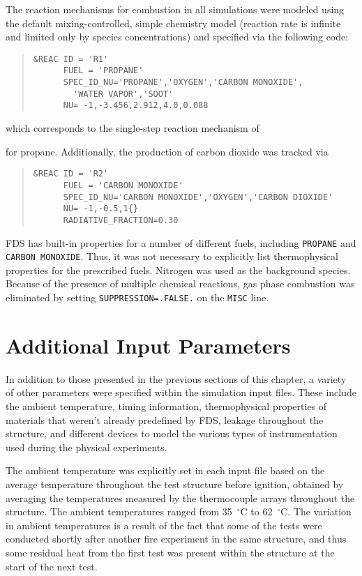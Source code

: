 The reaction mechanisms for combustion in all simulations were modeled using the default mixing-controlled, simple chemistry model (reaction rate is infinite and limited only by species concentrations) and specified via the following code:
\begin{quote}
\begin{verbatim}
&REAC ID = 'R1'
      FUEL = 'PROPANE'
      SPEC_ID_NU='PROPANE','OXYGEN','CARBON MONOXIDE',
        'WATER VAPOR','SOOT'
      NU= -1,-3.456,2.912,4.0,0.088 
\end{verbatim}
\end{quote}
\noindent which corresponds to the single-step reaction mechanism of
\begin{center}
\end{center}
for propane. Additionally, the production of carbon dioxide was tracked via
\begin{quote}
\begin{verbatim}
&REAC ID = 'R2'
      FUEL = 'CARBON MONOXIDE'
      SPEC_ID_NU='CARBON MONOXIDE','OXYGEN','CARBON DIOXIDE'
      NU= -1,-0.5,1{}
      RADIATIVE_FRACTION=0.30   
\end{verbatim}
\end{quote}

FDS has built-in properties for a number of different fuels, including \verb|PROPANE| and \verb|CARBON MONOXIDE|. Thus, it was not necessary to explicitly list thermophysical properties for the prescribed fuels. Nitrogen was used as the background species. Because of the presence of multiple chemical reactions, gas phase combustion was eliminated by setting \verb|SUPPRESSION=.FALSE.| on the \verb|MISC| line.

\section{Additional Input Parameters}
In addition to those presented in the previous sections of this chapter, a variety of other parameters were specified within the simulation input files. These include the ambient temperature, timing information, thermophysical properties of materials that weren't already predefined by FDS, leakage throughout the structure, and different devices to model the various types of instrumentation used during the physical experiments.

The ambient temperature was explicitly set in each input file based on the average temperature throughout the test structure before ignition, obtained by averaging the temperatures measured by the thermocouple arrays throughout the structure. The ambient temperatures ranged from 35~$^\circ$C to 62~$^\circ$C. The variation in ambient temperatures is a result of the fact that some of the tests were conducted shortly after another fire experiment in the same structure, and thus some residual heat from the first test was present within the structure at the start of the next test.


